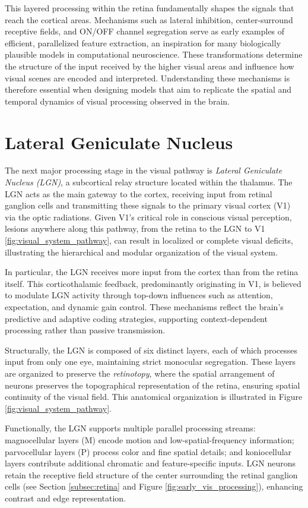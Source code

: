 This layered processing within the retina fundamentally shapes the signals that reach the cortical areas. Mechanisms such as lateral inhibition, center-surround receptive fields, and ON/OFF channel segregation serve as early examples of efficient, parallelized feature extraction, an inspiration for many biologically plausible models in computational neuroscience. These transformations determine the structure of the input received by the higher visual areas and influence how visual scenes are encoded and interpreted. Understanding these mechanisms is therefore essential when designing models that aim to replicate the spatial and temporal dynamics of visual processing observed in the brain.

\section{Lateral Geniculate Nucleus}
\label{sec:lgn}
The next major processing stage in the visual pathway is \emph{Lateral Geniculate Nucleus (LGN)}, a subcortical relay structure located within the thalamus. The LGN acts as the main gateway to the cortex, receiving input from retinal ganglion cells and transmitting these signals to the primary visual cortex (V1) via the optic radiations. Given V1's critical role in conscious visual perception, lesions anywhere along this pathway, from the retina to the LGN to V1 \ref{fig:visual_system_pathway}, can result in localized or complete visual deficits, illustrating the hierarchical and modular organization of the visual system.

In particular, the LGN receives more input from the cortex than from the retina itself. This corticothalamic feedback, predominantly originating in V1, is believed to modulate LGN activity through top-down influences such as attention, expectation, and dynamic gain control. These mechanisms reflect the brain's predictive and adaptive coding strategies, supporting context-dependent processing rather than passive transmission.

Structurally, the LGN is composed of six distinct layers, each of which processes input from only one eye, maintaining strict monocular segregation. These layers are organized to preserve the \emph{retinotopy}, where the spatial
arrangement of neurons preserves the topographical representation of the retina, ensuring spatial continuity of the visual field. This anatomical organization is illustrated in Figure \ref{fig:visual_system_pathway}.

Functionally, the LGN supports multiple parallel processing streams: magnocellular layers (M) encode motion and low-spatial-frequency information; parvocellular layers (P) process color and fine spatial details; and koniocellular layers contribute additional chromatic and feature-specific inputs. LGN neurons retain the receptive field structure of the center surrounding the retinal ganglion cells (see Section \ref{subsec:retina} and Figure \ref{fig:early_vis_processing}), enhancing contrast and edge representation.


